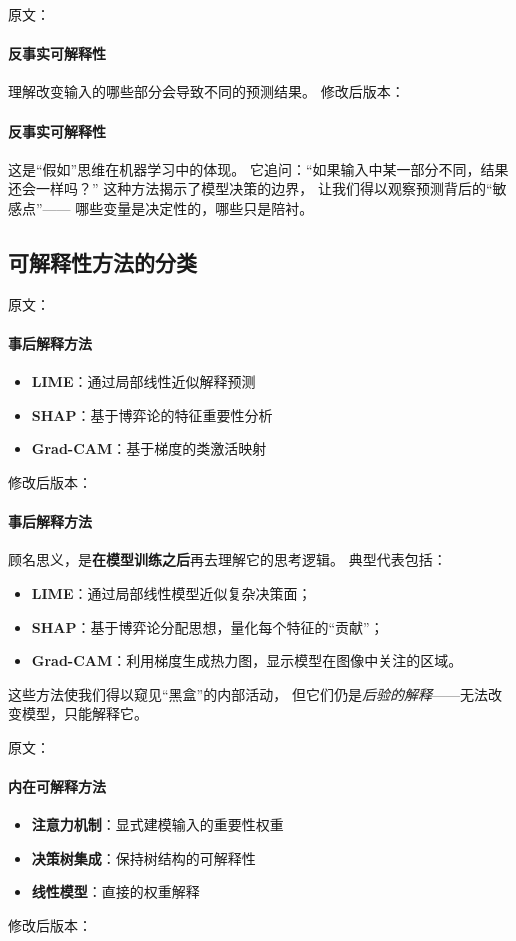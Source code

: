 原文：
\paragraph{反事实可解释性}
理解改变输入的哪些部分会导致不同的预测结果。
修改后版本：
\paragraph{反事实可解释性}  
这是“假如”思维在机器学习中的体现。  
它追问：“如果输入中某一部分不同，结果还会一样吗？”  
这种方法揭示了模型决策的边界，  
让我们得以观察预测背后的“敏感点”——  
哪些变量是决定性的，哪些只是陪衬。



\subsection{可解释性方法的分类}

原文：
\paragraph{事后解释方法}
\begin{itemize}
\item \textbf{LIME}：通过局部线性近似解释预测
\item \textbf{SHAP}：基于博弈论的特征重要性分析
\item \textbf{Grad-CAM}：基于梯度的类激活映射
\end{itemize}
修改后版本：
\paragraph{事后解释方法}  
顾名思义，是\textbf{在模型训练之后}再去理解它的思考逻辑。  
典型代表包括：  
\begin{itemize}
\item \textbf{LIME}：通过局部线性模型近似复杂决策面；  
\item \textbf{SHAP}：基于博弈论分配思想，量化每个特征的“贡献”；  
\item \textbf{Grad-CAM}：利用梯度生成热力图，显示模型在图像中关注的区域。  
\end{itemize}
这些方法使我们得以窥见“黑盒”的内部活动，  
但它们仍是\textit{后验的解释}——无法改变模型，只能解释它。



原文：
\paragraph{内在可解释方法}
\begin{itemize}
\item \textbf{注意力机制}：显式建模输入的重要性权重
\item \textbf{决策树集成}：保持树结构的可解释性
\item \textbf{线性模型}：直接的权重解释
\end{itemize}
修改后版本：
